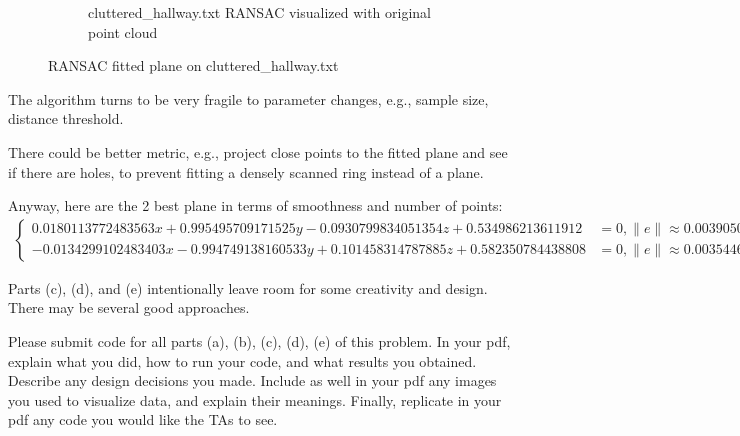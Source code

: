 \documentclass[conference,onecolumn]{IEEEtran}
\begin{document}
\begin{enumerate}[label=\arabic{enumi}.]
\begin{enumerate}
\begin{figure}[H]
\begin{subfigure}{.49\linewidth}
                                    \caption{cluttered\_hallway.txt RANSAC visualized with original point cloud}
                              \end{subfigure}
                              \caption{RANSAC fitted plane on cluttered\_hallway.txt}
                        \end{figure}
                        The algorithm turns to be very fragile to parameter changes, e.g., sample size, distance threshold.

                        There could be better metric, e.g., project close points to the fitted plane and see if there are holes, to prevent fitting a densely scanned ring instead of a plane.

                        Anyway, here are the 2 best plane in terms of smoothness and number of points:
                        \begin{align*}
                              \begin{cases}
                                    0.0180113772483563x + 0.995495709171525y - 0.0930799834051354z + 0.534986213611912 & = 0, \|e\| \approx 0.0039050967482275882 \\
                                    -0.0134299102483403x - 0.994749138160533y + 0.101458314787885z + 0.582350784438808 & = 0, \|e\| \approx 0.0035446492378242746
                              \end{cases}
                        \end{align*}
            \end{enumerate}
            Parts (c), (d), and (e) intentionally leave room for some creativity and design.
            There may be several good approaches.

            Please submit code for all parts (a), (b), (c), (d), (e) of this problem.
            In your pdf, explain what you did, how to run your code, and what results you obtained.
            Describe any design decisions you made.
            Include as well in your pdf any images you used to visualize data, and explain their meanings.
            Finally, replicate in your pdf any code you would like the TAs to see.
\end{enumerate}
\end{document}
